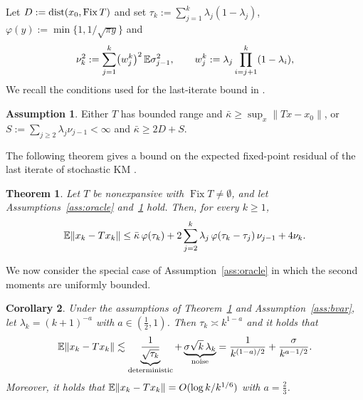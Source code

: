 \documentclass[10pt,draft]{article}
\numberwithin{equation}{section}
\newtheorem{theorem}{Theorem}[section]
\newtheorem{corollary}[theorem]{Corollary}
\theoremstyle{definition}
\newtheorem{assumption}{Assumption}[section]
\theoremstyle{remark}
\DeclareMathOperator{\Fix}{Fix}
\newcommand{\norm}[1]{\lVert #1\rVert}
\begin{document}
Let $D:=\dist(x_0,\Fix T)$ and set
$\tau_k:=\sum_{j=1}^{k}\lambda_j(1-\lambda_j)$,
$\varphi(y):=\min\{1,1/\sqrt{\pi y}\}$ and
\[
 \nu_k^2:=\sum_{j=1}^{k}\bigl(w_j^k\bigr)^2\,\mathbb{E}\sigma_{j-1}^2,
 \qquad w_j^k:=\lambda_j\prod_{i=j+1}^{k}(1-\lambda_i),
\]
We recall the conditions used for the last-iterate bound
in \cite{bravo2024stochastic}.
\begin{assumption}\label{ass:h4}
Either $T$ has bounded range and $\bar\kappa\geq\sup_{x}\norm{Tx-x_0}$, or
$S:=\sum_{j\geq2}\lambda_j\nu_{j-1}<\infty$ and $\bar\kappa\geq2D+S$.
\end{assumption}
The following theorem gives a bound on the expected fixed-point residual
of the last iterate of stochastic KM
\cite[Theorem~2.10]{bravo2024stochastic}.
\begin{theorem}\label{thm:skm}
Let $T$ be nonexpansive with $\Fix T\neq\emptyset$, and let Assumptions~\ref{ass:oracle} and~\ref{ass:h4} hold.
Then, for every $k\geq1$,
\begin{equation}\label{eq:skm-bound}
 \EE\norm{x_k-Tx_k}\leq\bar\kappa\,\varphi(\tau_k)
 +2\sum_{j=2}^{k}\lambda_j\,\varphi(\tau_k-\tau_j)\,\nu_{j-1}
 +4\nu_k .
\end{equation}
\end{theorem}

We now consider the special case of Assumption~\ref{ass:oracle} in which
the second moments are uniformly bounded.


\begin{corollary}{\cite[Theorem~4.4]{bravo2024stochastic}}\label{cor:skm}
Under the assumptions of Theorem~\ref{thm:skm} and
Assumption~\ref{ass:bvar}, let $\lambda_k=(k+1)^{-a}$ with
$a\in(\frac12,1)$. Then $\tau_k\asymp k^{1-a}$ and it holds that
\[
 \EE\norm{x_k-Tx_k}\lesssim
 \underbrace{\frac{1}{\sqrt{\tau_k}}}_{\text{deterministic}}
 +\underbrace{\sigma\sqrt{k}\,\lambda_k}_{\text{noise}}
 =\frac{1}{k^{(1-a)/2}}+\frac{\sigma}{k^{a-1/2}}.
\]
Moreover, it holds that 
$\EE\norm{x_k-Tx_k}=O(\log k/k^{1/6})$ with $a=\frac23$.
\end{corollary}
\end{document}
